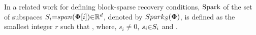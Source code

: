 In a related work for defining block-sparse recovery conditions, $\mathrm{Spark}$ of the set of subspaces $S_i {=} span(\boldsymbol{\Phi}[i]) {\in} \mathbb{R}^d$, denoted by $Spark_S(\boldsymbol{\Phi})$, is defined as the smallest integer $r$ such that 
, where, $s_i {\neq} 0$, $s_i {\in} S_i$ and 
 \cite{Ganesh2009}.